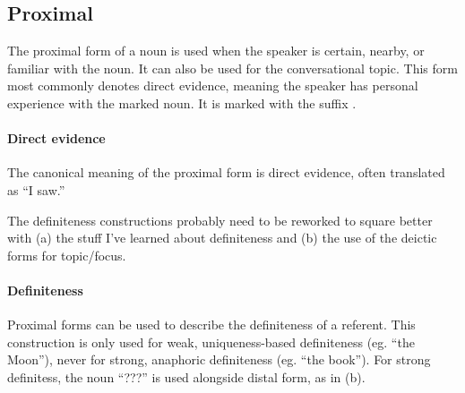 \subsection{Proximal}
The proximal form of a noun is used when the speaker is certain, nearby, or familiar with the noun. It can also be used for the conversational topic. This form most commonly denotes direct evidence, meaning the speaker has personal experience with the marked noun. It is marked with the suffix . 


\paragraph{Direct evidence}
The canonical meaning of the proximal form is direct evidence, often translated as “I saw.” 

\begin{kaobox}[frametitle=\sc todo:]
    The definiteness constructions probably need to be reworked to square better with (a) the stuff I've learned about definiteness and (b) the use of the deictic forms for topic/focus.
\end{kaobox}

\paragraph{Definiteness}
Proximal forms can be used to describe the definiteness of a referent. This construction is only used for weak, uniqueness-based definiteness (eg. “the Moon”), never for strong, anaphoric definiteness (eg. “the book”). For strong definitess, the noun  “???” is used alongside distal form, as in (\nextx b).

